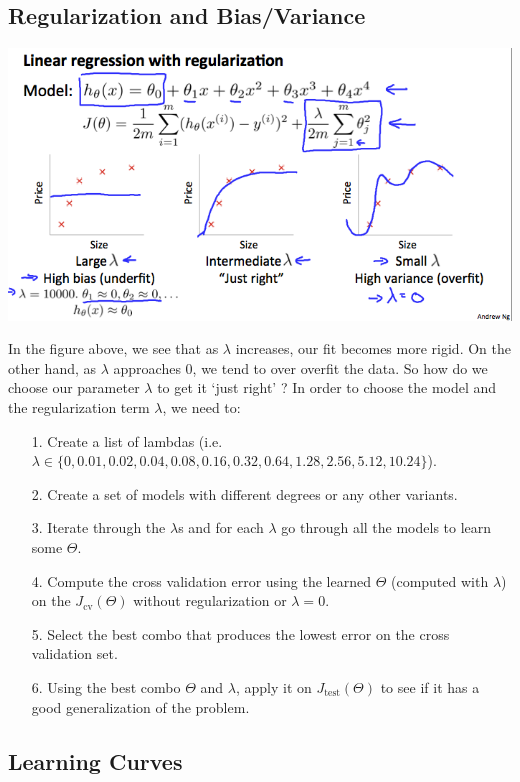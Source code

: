 \documentclass[UTF8]{article}
\begin{document}
\subsection{Regularization and Bias/Variance}

\includegraphics[width = \textwidth]{NotePics/10_4_1.png}

In the figure above, we see that as $\lambda$ increases, our fit becomes more rigid. On the other hand, as $\lambda$ approaches 0, we tend to over overfit the data. So how do we choose our parameter $\lambda$ to get it `just right' ? In order to choose the model and the regularization term $\lambda$, we need to:

\begin{itemize}
\item[{1.}]Create a list of lambdas (i.e. $\lambda\in\{0,0.01,0.02,0.04,0.08,0.16,0.32,0.64,1.28,2.56,5.12,10.24\}$).
\item[{2.}]Create a set of models with different degrees or any other variants.
\item[{3.}]Iterate through the $\lambda$s and for each $\lambda$ go through all the models to learn some $\Theta$.
\item[{4.}]Compute the cross validation error using the learned $\Theta$ (computed with $\lambda$) on the $J_\text{cv}(\Theta)$ without regularization or $\lambda = 0$.
\item[{5.}]Select the best combo that produces the lowest error on the cross validation set.
\item[{6.}]Using the best combo $\Theta$ and $\lambda$, apply it on $J_\text{test}(\Theta)$ to see if it has a good generalization of the problem.
\end{itemize}

\subsection{Learning Curves}
\end{document}
